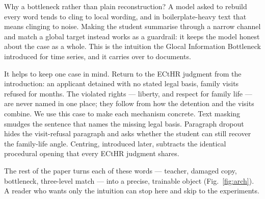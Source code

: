 \documentclass[conference]{IEEEtran}
\begin{document}
Why a bottleneck rather than plain reconstruction? A model asked to rebuild every
word tends to cling to local wording, and in boilerplate-heavy text that means
clinging to noise. Making the student summarise through a narrow channel and match a
global target instead works as a guardrail: it keeps the model honest about the case
as a whole. This is the intuition the Glocal Information Bottleneck
\cite{yang2025glocal} introduced for time series, and it carries over to documents.

It helps to keep one case in mind. Return to the ECtHR judgment from the
introduction: an applicant detained with no stated legal basis, family visits
refused for months. The violated rights --- liberty, and respect for family life ---
are never named in one place; they follow from how the detention and the visits
combine. We use this case to make each mechanism concrete. Text masking smudges the
sentence that names the missing legal basis. Paragraph dropout hides the
visit-refusal paragraph and asks whether the student can still recover the
family-life angle. Centring, introduced later, subtracts the identical procedural
opening that every ECtHR judgment shares.

The rest of the paper turns each of these words --- teacher, damaged copy,
bottleneck, three-level match --- into a precise, trainable object
(Fig.~\ref{fig:arch}). A reader who wants only the intuition can stop here and skip
to the experiments.
\end{document}
